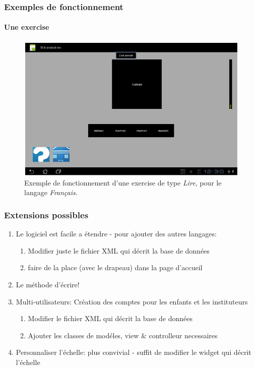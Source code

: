 \documentclass[15pt]{beamer}
\begin{document}
\begin{frame}
 \frametitle{Exemples de fonctionnement}
  \framesubtitle{Une exercise}
\begin{figure}[tr]
  \centering
  \includegraphics[scale=0.50]{./exercise.png}
  \caption{Exemple de fonctionnement d'une exercise de type \textit{Lire}, pour le langage \textit{Fran\c cais}.}
  \label{fig:figure1}
\end{figure}
\end{frame}


\begin{frame}
 \frametitle{Extensions possibles}
\begin{enumerate}
 \item Le logiciel est facile a \'etendre - pour ajouter des autres langages:
  \begin{enumerate}
    \item Modifier juste le fichier XML qui d\'ecrit la base de donn\'ees
    \item faire de la place (avec le drapeau) dans la page d'accueil
  \end{enumerate}
 \item Le m\'ethode d'\'ecrire!
 \item Multi-utilisateurs: Cr\'eation des comptes pour les enfants et les instituteurs
  \begin{enumerate}
    \item Modifier le fichier XML qui d\'ecrit la base de donn\'ees
    \item Ajouter les classes de mod\'eles, view \& controlleur necessaires
  \end{enumerate}
 \item Personnaliser l'\'echelle: plus convivial - suffit de modifier le 
  widget qui d\'ecrit l'\'echelle
\end{enumerate}
\end{frame}
\end{document}

